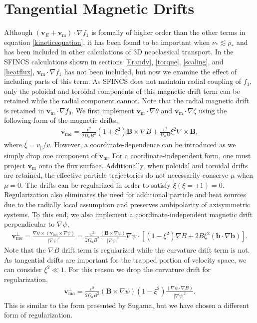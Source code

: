 \documentclass[aip, pop, preprint]{revtex4-1}
\begin{document}
\section{Tangential Magnetic Drifts}\label{mds}
Although $(\bm{v}_E + \bm{v}_{\mathrm{m}}) \cdot \nabla f_1$ is formally of higher order than the other terms in equation \ref{kineticequation}, it has been found to be important when $\nu_* \lesssim \rho_*$ \cite{Calvo2016, Matsuoka2015} and has been included in other calculations of 3D neoclassical transport. In the SFINCS calculations shown in sections \ref{Erandv}, \ref{torque}, \ref{scaling}, and \ref{heatflux}, $\bm{v}_{\mathrm{m}} \cdot \nabla f_1$ has not been included, but now we examine the effect of including parts of this term. As SFINCS does not maintain radial coupling of $f_1$, only the poloidal and toroidal components of this magnetic drift term can be retained while the radial component cannot. Note that the radial magnetic drift is retained in $\bm{v}_{\mathrm{m}} \cdot \nabla f_0$. We first implement $\bm{v}_{\mathrm{m}} \cdot \nabla \theta$ and $\bm{v}_{\mathrm{m}}  \cdot \nabla \zeta$ using the following form of the magnetic drifts,
\begin{gather}
\bm{v}_{\mathrm{m} a} = \frac{v^2}{2 \Omega_a B^2} (1 + \xi^2) \bm{B} \times \nabla B + \frac{v^2}{\Omega_a B} \xi^2 \nabla \times \bm{B},
\label{eq:mds1}
\end{gather}
where $\xi = v_{||}/v$. However, a coordinate-dependence can be introduced as we simply drop one component of $\bm{v}_{\mathrm{m}}$. For a coordinate-independent form, one must project $\bm{v}_{\mathrm{m}}$ onto the flux surface. Additionally, when poloidal and toroidal drifts are retained, the effective particle trajectories do not necessarily conserve $\mu$ when $\mu = 0$. The drifts can be regularized in order to satisfy $\dot{\xi} (\xi = \pm 1) = 0$. Regularization also eliminates the need for additional particle and heat sources due to the radially local assumption and preserves ambipolarity of axisymmetric systems.\cite{Sugama2016} To this end, we also implement a coordinate-independent magnetic drift perpendicular to $\nabla \psi$,
\begin{gather}
\bm{v}_{\mathrm{m}a}^{\perp} = \frac{\nabla \psi \times (\bm{v}_{\mathrm{m}a} \times \nabla \psi)}{\rvert \nabla \psi \rvert^2}= \frac{v^2}{2\Omega_a B^2 } \frac{(\bm{B} \times \nabla \psi)}{\rvert \nabla \psi \rvert^2} \nabla \psi \cdot\left[(1-\xi^2)\nabla B + 2B\xi^2 (\bm{b} \cdot \nabla \bm{b}) \right].
\end{gather}
Note that the $\nabla B$ drift term is regularized while the curvature drift term is not. As tangential drifts are important for the trapped portion of velocity space, we can consider $\xi^2 \ll 1$. For this reason we drop the curvature drift for regularization,
\begin{gather}
\bm{v}_{\mathrm{m}a}^{\perp} = \frac{v^2}{2\Omega_aB^2} (\bm{B} \times \nabla \psi) (1 - \xi^2) \frac{(\nabla \psi \cdot \nabla B)}{\rvert \nabla \psi \rvert^2}.
\label{eq:mds5}
\end{gather}
This is similar to the form presented by Sugama,\cite{Sugama2016} but we have chosen a different form of regularization. 
\end{document}
